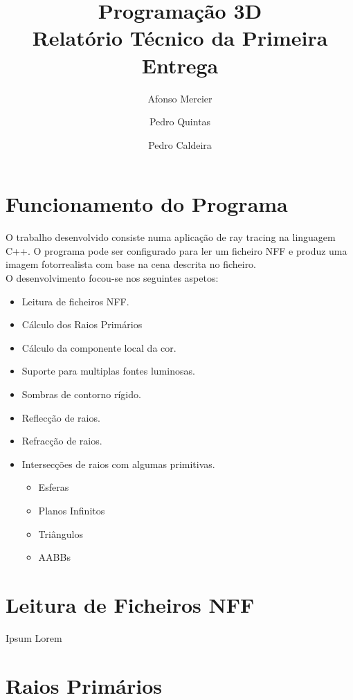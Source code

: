 \documentclass{article}
\title{
    \textbf{Programação 3D} \\
    Relatório Técnico da Primeira Entrega
}
\author{Afonso Mercier \and Pedro Quintas \and Pedro Caldeira}
\date{}
\begin{document}
    \maketitle

    \begin{multicols}{2}
    \section{Funcionamento do Programa}

    O trabalho desenvolvido consiste numa aplicação de ray tracing na linguagem
    C++. O programa pode ser configurado para ler um ficheiro NFF e produz uma
    imagem fotorrealista com base na cena descrita no ficheiro. \\
    O desenvolvimento focou-se nos seguintes aspetos:

    \begin{itemize}
        \item Leitura de ficheiros NFF.
        \item Cálculo dos Raios Primários
        \item Cálculo da componente local da cor.
        \item Suporte para multiplas fontes luminosas.
        \item Sombras de contorno rígido.
        \item Reflecção de raios.
        \item Refracção de raios.
        \item Intersecções de raios com algumas primitivas.
        \begin{itemize}
            \item Esferas
            \item Planos Infinitos
            \item Triângulos
            \item AABBs
        \end{itemize}
    \end{itemize}

    \section{Leitura de Ficheiros NFF}
    
    Ipsum Lorem

    \section{Raios Primários}


\end{multicols}
\end{document}
